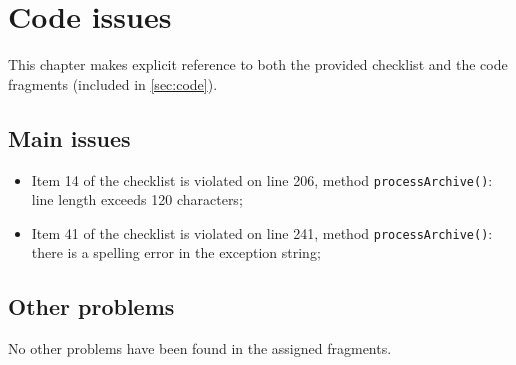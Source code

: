 \chapter{Code issues}
This chapter makes explicit reference to both the provided checklist and the code fragments (included in \autoref{sec:code}).

\section{Main issues}
\begin{itemize}
\item Item 14 of the checklist is violated on line 206, method \texttt{processArchive()}: line length exceeds 120 characters;
\item Item 41 of the checklist is violated on line 241, method \texttt{processArchive()}: there is a spelling error in the exception string;
\end{itemize}

\section{Other problems}
No other problems have been found in the assigned fragments.
